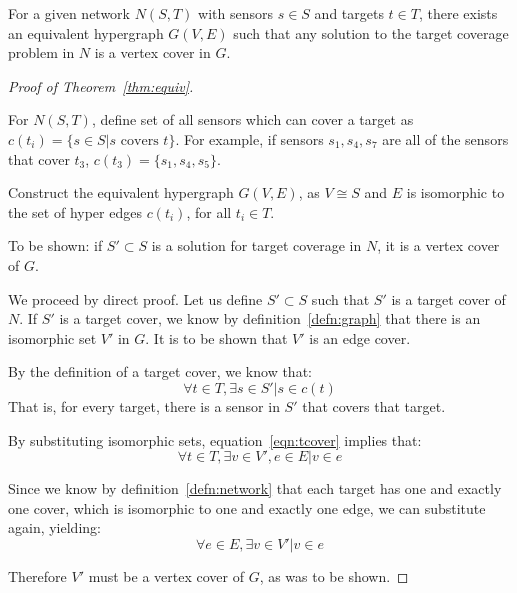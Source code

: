 \begin{thm}
  For a given network $N(S,T)$ with sensors $s\in S$ and targets $t\in T$, there exists an equivalent hypergraph $G(V,E)$ such that any solution to the target coverage problem in $N$ is a vertex cover in $G$.
\label{thm:equiv}
\end{thm}
\begin{proof}[Proof of Theorem~\ref{thm:equiv}]
\begin{defn}
For $N(S,T)$, define set of all sensors which can cover a target as $c(t_i) = \{s \in S | s \text{\ covers\ } t\}$.  For example, if sensors $s_1, s_4, s_7$ are all of the sensors that cover $t_3$, $c(t_3) = \{s_1, s_4, s_5\}$. \label{defn:network}
\end{defn}
\begin{defn}Construct the equivalent hypergraph $G(V,E)$, as $V \cong S$ and $E$ is isomorphic to the set of hyper edges $c(t_i)$, for all $t_i \in T$. 
\label{defn:graph}
\end{defn}

To be shown: if $S' \subset S$ is a solution for target coverage in $N$, it is a vertex cover of $G$. 

We proceed by direct proof. Let us define $S'\subset S$ such that $S'$ is a target cover of $N$. If $S'$ is a target cover, we know by definition~\ref{defn:graph} that there is an isomorphic set $V'$ in $G$. It is to be shown that $V'$ is an edge cover.

By the definition of a target cover, we know that:
\begin{equation}
\forall t \in T, \exists s \in S' | s \in c(t)
\label{eqn:tcover}
\end{equation}
That is, for every target, there is a sensor in $S'$ that covers that target.

By substituting isomorphic sets, equation~\ref{eqn:tcover} implies that:
\begin{equation}
\forall t \in T, \exists v \in V', e \in E | v \in e
\label{eqn:tvbridge}
\end{equation}

Since we know by definition~\ref{defn:network} that each target has one and exactly one cover, which is isomorphic to one and exactly one edge, we can substitute again, yielding:
\begin{equation}
\forall e \in E, \exists v\in V' | v \in e
\end{equation}

Therefore $V'$ must be a vertex cover of $G$, as was to be shown.  
\end{proof}
